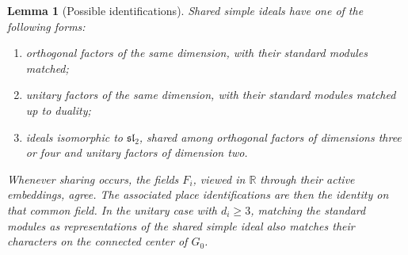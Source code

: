 \documentclass[11pt]{article}
\numberwithin{equation}{section}
\newtheorem{lemma}[theorem]{Lemma}
\theoremstyle{definition}
\theoremstyle{remark}
\newcommand{\R}{\mathbb R}
\begin{document}
\begin{lemma}[Possible identifications]\label{lem:mixed-shared}
Shared simple ideals have one of the following forms:
\begin{enumerate}
\item orthogonal factors of the same dimension, with their standard
  modules matched;
\item unitary factors of the same dimension, with their standard
  modules matched up to duality;
\item ideals isomorphic to $\mathfrak{sl}_2$, shared among orthogonal
  factors of dimensions three or four and unitary factors of
  dimension two.
\end{enumerate}
Whenever sharing occurs, the fields $F_i$, viewed in $\R$ through
their active embeddings, agree.  The associated place identifications
are then the identity on that common field.  In the unitary case with
$d_i\ge3$, matching the standard modules as representations of the
shared simple ideal also matches their characters on the connected
center of $G_0$.
\end{lemma}
\end{document}
